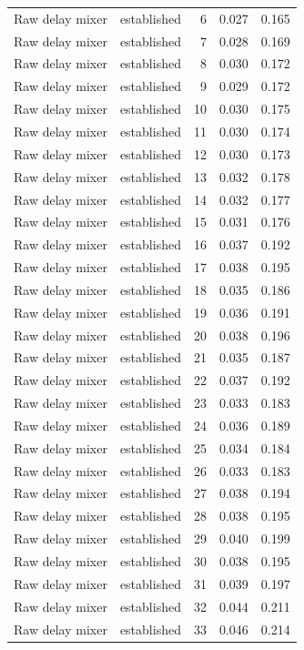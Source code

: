 \begin{tabular}{llrrr}
Raw delay mixer & established & 6 & 0.027 & 0.165 \\
Raw delay mixer & established & 7 & 0.028 & 0.169 \\
Raw delay mixer & established & 8 & 0.030 & 0.172 \\
Raw delay mixer & established & 9 & 0.029 & 0.172 \\
Raw delay mixer & established & 10 & 0.030 & 0.175 \\
Raw delay mixer & established & 11 & 0.030 & 0.174 \\
Raw delay mixer & established & 12 & 0.030 & 0.173 \\
Raw delay mixer & established & 13 & 0.032 & 0.178 \\
Raw delay mixer & established & 14 & 0.032 & 0.177 \\
Raw delay mixer & established & 15 & 0.031 & 0.176 \\
Raw delay mixer & established & 16 & 0.037 & 0.192 \\
Raw delay mixer & established & 17 & 0.038 & 0.195 \\
Raw delay mixer & established & 18 & 0.035 & 0.186 \\
Raw delay mixer & established & 19 & 0.036 & 0.191 \\
Raw delay mixer & established & 20 & 0.038 & 0.196 \\
Raw delay mixer & established & 21 & 0.035 & 0.187 \\
Raw delay mixer & established & 22 & 0.037 & 0.192 \\
Raw delay mixer & established & 23 & 0.033 & 0.183 \\
Raw delay mixer & established & 24 & 0.036 & 0.189 \\
Raw delay mixer & established & 25 & 0.034 & 0.184 \\
Raw delay mixer & established & 26 & 0.033 & 0.183 \\
Raw delay mixer & established & 27 & 0.038 & 0.194 \\
Raw delay mixer & established & 28 & 0.038 & 0.195 \\
Raw delay mixer & established & 29 & 0.040 & 0.199 \\
Raw delay mixer & established & 30 & 0.038 & 0.195 \\
Raw delay mixer & established & 31 & 0.039 & 0.197 \\
Raw delay mixer & established & 32 & 0.044 & 0.211 \\
Raw delay mixer & established & 33 & 0.046 & 0.214 \\

\end{tabular}
